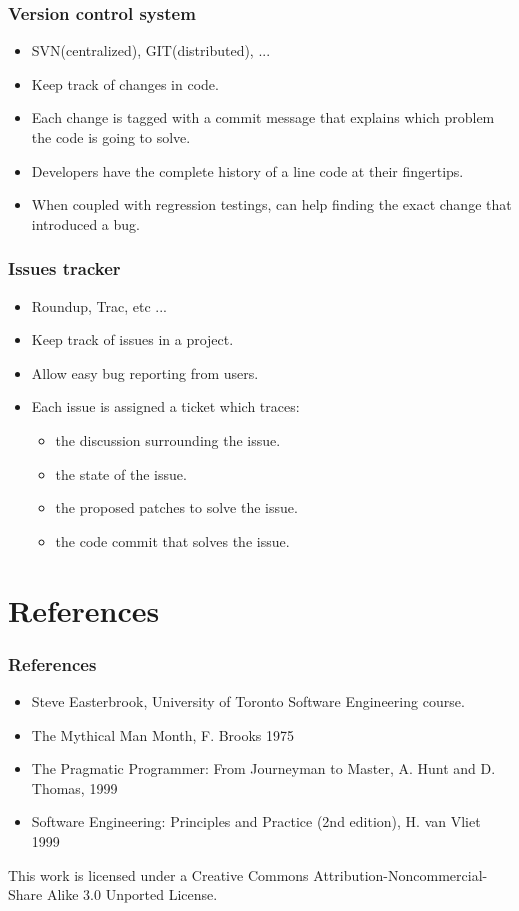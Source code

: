 \documentclass[10pt]{beamer}
\begin{document}
\begin{frame}[fragile]
  \frametitle{Version control system}
  \begin{itemize}
  \item SVN(centralized), GIT(distributed), ...
  \item Keep track of changes in code.
  \item Each change is tagged with a commit message that explains which problem
    the code is going to solve.
  \item Developers have the complete history of a line code at their
    fingertips.
  \item When coupled with regression testings, can help finding the exact change
    that introduced a bug.
  \end{itemize}
\end{frame}

\begin{frame}[fragile]
  \frametitle{Issues tracker}
  \begin{itemize}
    \item Roundup, Trac, etc ...
  \item Keep track of issues in a project.
  \item Allow easy bug reporting from users.
  \item Each issue is assigned a ticket which traces:
    \begin{itemize}
    \item the discussion surrounding the issue.
    \item the state of the issue.
    \item the proposed patches to solve the issue.
    \item the code commit that solves the issue.
    \end{itemize}
  \end{itemize}
\end{frame}

\section{References}
\begin{frame}[fragile]
  \frametitle{References}
  \begin{itemize}
    \item Steve Easterbrook, University of Toronto Software Engineering course.
    \item The Mythical Man Month, F. Brooks 1975
    \item The Pragmatic Programmer: From Journeyman to Master, A. Hunt and
      D. Thomas, 1999
    \item Software Engineering: Principles and Practice (2nd edition), H. van Vliet 1999
  \end{itemize}
\end{frame}

\begin{frame}[fragile]
  \begin{center}
    \tiny
    This work is licensed under a Creative Commons Attribution-Noncommercial-Share Alike 3.0 Unported License.
  \end{center}
\end{frame}
\end{document}
